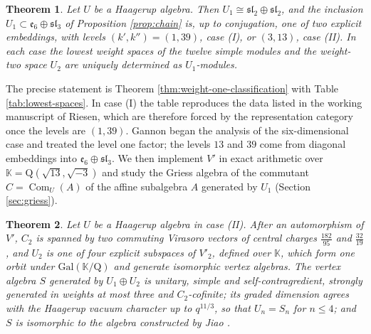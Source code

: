 \documentclass[leqno]{article}
\newcommand{\K}{\ensuremath{\mathbb{K}}}
\newcommand{\Q}{\mathrm{Q}}
\renewcommand{\leq}{\ensuremath{\leqslant}}
\newtheorem{thm}{Theorem}[section]
\numberwithin{equation}{section}
\begin{document}
\begin{thm}
\label{thm:intro-lie}
Let $U$ be a Haagerup algebra. Then $U_1 \cong \mathfrak{sl}_2 \oplus \mathfrak{sl}_2$, and the inclusion $U_1 \subset \mathfrak e_6 \oplus \mathfrak{sl}_3$ of Proposition \ref{prop:chain} is, up to conjugation, one of two explicit embeddings, with levels $(k',k'') = (1,39)$, case (I), or $(3,13)$, case (II). In each case the lowest weight spaces of the twelve simple modules and the weight-two space $U_2$ are uniquely determined as $U_1$-modules.
\end{thm}

The precise statement is Theorem \ref{thm:weight-one-classification} with Table \ref{tab:lowest-spaces}. In case (I) the table reproduces the data listed in the working manuscript \cite{Rie26b} of Riesen, which are therefore forced by the representation category once the levels are $(1,39)$. Gannon \cite[Section 3.3]{Gan19} began the analysis of the six-dimensional case and treated the level one factor; the levels $13$ and $39$ come from diagonal embeddings into $\mathfrak e_6 \oplus \mathfrak{sl}_3$. We then implement $V'$ in exact arithmetic over $\K = \Q(\sqrt{13},\sqrt{-3})$ and study the Griess algebra of the commutant $C = \operatorname{Com}_U(A)$ of the affine subalgebra $A$ generated by $U_1$ (Section \ref{sec:griess}).

\begin{thm}
\label{thm:intro-case-two}
Let $U$ be a Haagerup algebra in case (II). After an automorphism of $V'$, $C_2$ is spanned by two commuting Virasoro vectors of central charges $\frac{182}{95}$ and $\frac{32}{19}$, and $U_2$ is one of four explicit subspaces of $V'_2$, defined over $\K$, which form one orbit under $\mathrm{Gal}(\K/\Q)$ and generate isomorphic vertex algebras. The vertex algebra $S$ generated by $U_1 \oplus U_2$ is unitary, simple and self-contragredient, strongly generated in weights at most three and $C_2$-cofinite; its graded dimension agrees with the Haagerup vacuum character up to $q^{11/3}$, so that $U_n = S_n$ for $n \leq 4$; and $S$ is isomorphic to the algebra constructed by Jiao \cite{Jia26}.
\end{thm}
\end{document}
